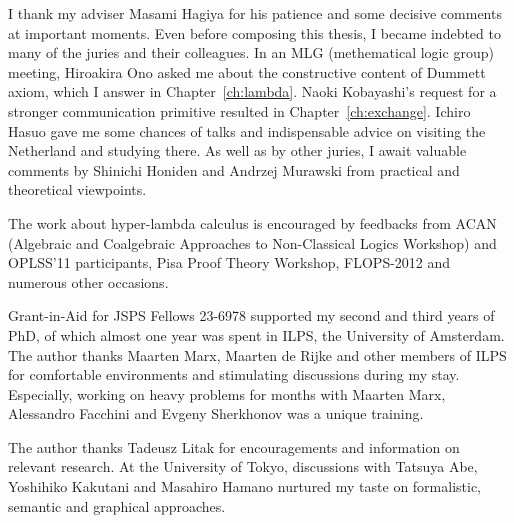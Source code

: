 \begin{acknowledge}
 I thank my adviser Masami Hagiya for his patience and some decisive
 comments at important moments.
 Even before composing this thesis, I became indebted to many of the
 juries and their colleagues.
 In an MLG (methematical logic group) meeting, Hiroakira Ono asked me
 about the constructive content of Dummett axiom, which I answer in
 Chapter~\ref{ch:lambda}.
 Naoki Kobayashi's request for a stronger communication primitive
 resulted in Chapter~\ref{ch:exchange}.
 Ichiro Hasuo gave me some chances of talks and
 indispensable advice on visiting the Netherland
 and studying there.
 As well as by other juries,
 I await valuable comments by Shinichi Honiden and Andrzej Murawski from
 practical and theoretical viewpoints.

 The work about hyper-lambda calculus is encouraged by feedbacks from
 ACAN (Algebraic and Coalgebraic Approaches to
 Non-Classical Logics Workshop) and OPLSS'11 participants,
 Pisa Proof Theory Workshop, FLOPS-2012
 and numerous other occasions.

 Grant-in-Aid for JSPS Fellows 23-6978 supported
 my second and third years of PhD, of which almost one year was spent
 in ILPS, the University of Amsterdam.
 The author thanks Maarten Marx, Maarten de Rijke and other members of ILPS for
 comfortable environments and stimulating discussions during my stay.
 Especially, working on heavy problems for months with Maarten Marx, Alessandro
 Facchini and Evgeny Sherkhonov was a unique training.

 The author thanks Tadeusz Litak for encouragements and
 information on relevant research.
 At the University of Tokyo,
 discussions with Tatsuya Abe, Yoshihiko Kakutani and Masahiro Hamano
 nurtured my taste on formalistic, semantic and graphical approaches.
\end{acknowledge}
